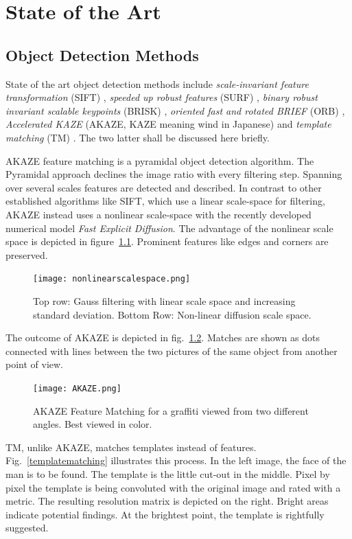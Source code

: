 \chapter{State of the Art\label{cha:chapter2}}
\section{Object Detection Methods}
State of the art object detection methods include \textit{scale-invariant feature transformation} (SIFT) \cite{Lowe2004DistinctiveKeypoints}, \textit{speeded up robust features} (SURF) \cite{Bay2008Speeded-UpSURF}, \textit{binary robust invariant scalable
keypoints} (BRISK) \cite{Leutenegger2011BRISK:Keypoints}, \textit{oriented fast and rotated BRIEF} (ORB) \cite{Rublee2011ORB:SURF}, \textit{Accelerated KAZE} (AKAZE, KAZE meaning wind in Japanese) \cite{Alcantarilla2012KAZEFeatures, Alcantarilla2013FastSpaces} and \textit{template matching} (TM) \cite{Brunelli2009TemplatePractice}. The two latter shall be discussed here briefly.

AKAZE feature matching is a pyramidal object detection algorithm. The Pyramidal approach declines the image ratio with every filtering step. Spanning over several scales features are detected and described. In contrast to other established algorithms like SIFT, which use a linear scale-space for filtering, AKAZE instead uses a nonlinear scale-space with the recently developed numerical model \textit{Fast Explicit Diffusion}. The advantage of the nonlinear scale space is depicted in figure~\ref{skalenraum}. Prominent features like edges and corners are preserved. 
\begin{figure}[ht]
	\centering
  \texttt{[image: nonlinearscalespace.png]}
	\caption[Gauss filtering]{Top row: Gauss filtering with linear scale space and increasing standard deviation. Bottom Row: Non-linear diffusion scale space.~\cite{Alcantarilla2012KAZEFeatures}}
	\label{skalenraum}
\end{figure}
The outcome of AKAZE is depicted in fig.~\ref{AKAZE}. Matches are shown as dots connected with lines between the two pictures of the same object from another point of view.
\begin{figure}[ht]
	\centering
  \texttt{[image: AKAZE.png]}
	\caption[AKAZE Feature Matching]{AKAZE Feature Matching for a graffiti viewed from two different angles. Best viewed in color.~\cite{OpenCV-DocumentationTutorial2018}}
	\label{AKAZE}
\end{figure}
TM, unlike AKAZE, matches templates instead of features. Fig.~\ref{templatematching} illustrates this process. In the left image, the face of the man is to be found. The template is the little cut-out in the middle. Pixel by pixel the template is being convoluted with the original image and rated with a metric. The resulting resolution matrix is depicted on the right. Bright areas indicate potential findings. At the brightest point, the template is rightfully suggested.

